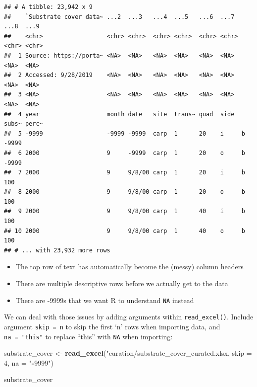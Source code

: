 \documentclass[]{book}
\newenvironment{Shaded}{\begin{snugshade}}{\end{snugshade}}
\newcommand{\DecValTok}[1]{\textcolor[rgb]{0.00,0.00,0.81}{#1}}
\newcommand{\KeywordTok}[1]{\textcolor[rgb]{0.13,0.29,0.53}{\textbf{#1}}}
\newcommand{\NormalTok}[1]{#1}
\newcommand{\OperatorTok}[1]{\textcolor[rgb]{0.81,0.36,0.00}{\textbf{#1}}}
\newcommand{\StringTok}[1]{\textcolor[rgb]{0.31,0.60,0.02}{#1}}
\providecommand{\tightlist}{%
  \setlength{\itemsep}{0pt}\setlength{\parskip}{0pt}}
\begin{document}
\begin{verbatim}
## # A tibble: 23,942 x 9
##    `Substrate cover data~ ...2  ...3   ...4  ...5   ...6  ...7  ...8  ...9 
##    <chr>                  <chr> <chr>  <chr> <chr>  <chr> <chr> <chr> <chr>
##  1 Source: https://porta~ <NA>  <NA>   <NA>  <NA>   <NA>  <NA>  <NA>  <NA> 
##  2 Accessed: 9/28/2019    <NA>  <NA>   <NA>  <NA>   <NA>  <NA>  <NA>  <NA> 
##  3 <NA>                   <NA>  <NA>   <NA>  <NA>   <NA>  <NA>  <NA>  <NA> 
##  4 year                   month date   site  trans~ quad  side  subs~ perc~
##  5 -9999                  -9999 -9999  carp  1      20    i     b     -9999
##  6 2000                   9     -9999  carp  1      20    o     b     -9999
##  7 2000                   9     9/8/00 carp  1      20    i     b     100  
##  8 2000                   9     9/8/00 carp  1      20    o     b     100  
##  9 2000                   9     9/8/00 carp  1      40    i     b     100  
## 10 2000                   9     9/8/00 carp  1      40    o     b     100  
## # ... with 23,932 more rows
\end{verbatim}

\begin{itemize}
\tightlist
\item
  The top row of text has automatically become the (messy) column headers
\item
  There are multiple descriptive rows before we actually get to the data
\item
  There are -9999s that we want R to understand \texttt{NA} instead
\end{itemize}

We can deal with those issues by adding arguments within \texttt{read\_excel()}. Include argument \texttt{skip\ =\ n} to skip the first `n' rows when importing data, and \texttt{na\ =\ "this"} to replace ``this'' with \texttt{NA} when importing:

\begin{Shaded}
\begin{Highlighting}[]
\NormalTok{substrate_cover <-}\StringTok{ }\KeywordTok{read_excel}\NormalTok{(}\StringTok{"curation/substrate_cover_curated.xlsx, skip = 4, na = "}\OperatorTok{-}\DecValTok{9999}\StringTok{")}
\end{Highlighting}
\end{Shaded}

\begin{Shaded}
\begin{Highlighting}[]
\NormalTok{substrate_cover}
\end{Highlighting}
\end{Shaded}
\end{document}

